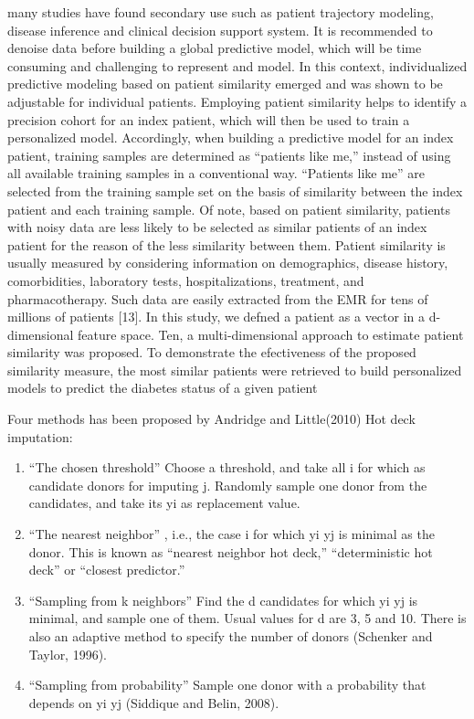 \documentclass{article}
\begin{document}
many studies have found secondary use such as patient trajectory
modeling, disease inference and clinical decision support system. It is
recommended to denoise data before building a global predictive model,
which will be time consuming and challenging to represent and model. In
this context, individualized predictive modeling based on patient
similarity emerged and was shown to be adjustable for individual
patients. Employing patient similarity helps to identify a precision
cohort for an index patient, which will then be used to train a
personalized model. Accordingly, when building a predictive model for an
index patient, training samples are determined as ``patients like me,''
instead of using all available training samples in a conventional way.
``Patients like me'' are selected from the training sample set on the
basis of similarity between the index patient and each training sample.
Of note, based on patient similarity, patients with noisy data are less
likely to be selected as similar patients of an index patient for the
reason of the less similarity between them. Patient similarity is
usually measured by considering information on demographics, disease
history, comorbidities, laboratory tests, hospitalizations, treatment,
and pharmacotherapy. Such data are easily extracted from the EMR for
tens of millions of patients {[}13{]}. In this study, we defned a
patient as a vector in a d-dimensional feature space. Ten, a
multi-dimensional approach to estimate patient similarity was proposed.
To demonstrate the efectiveness of the proposed similarity measure, the
most similar patients were retrieved to build personalized models to
predict the diabetes status of a given patient

Four methods has been proposed by Andridge and Little(2010) Hot deck
imputation:

\begin{enumerate}
\def\labelenumi{\arabic{enumi}.}
\item
  ``The chosen threshold'' Choose a threshold, and take all i for which
  as candidate donors for imputing j. Randomly sample one donor from the
  candidates, and take its yi as replacement value.
\item
  ``The nearest neighbor'' , i.e., the case i for which \textbar yi yj
  \textbar{} is minimal as the donor. This is known as ``nearest
  neighbor hot deck,'' ``deterministic hot deck'' or ``closest
  predictor.''
\item
  ``Sampling from k neighbors'' Find the d candidates for which
  \textbar yi yj \textbar{} is minimal, and sample one of them. Usual
  values for d are 3, 5 and 10. There is also an adaptive method to
  specify the number of donors (Schenker and Taylor, 1996).
\item
  ``Sampling from probability'' Sample one donor with a probability that
  depends on \textbar yi yj \textbar{} (Siddique and Belin, 2008).
\end{enumerate}
\end{document}
